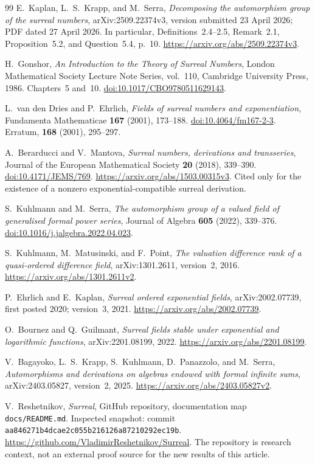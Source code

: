 \documentclass[11pt]{article}
\theoremstyle{definition}
\theoremstyle{remark}
\numberwithin{equation}{section}
\begin{document}
\begin{thebibliography}{99}
E.~Kaplan, L.~S.~Krapp, and M.~Serra,
\emph{Decomposing the automorphism group of the surreal numbers},
arXiv:2509.22374v3, version submitted 23 April 2026; PDF dated 27 April 2026.
In particular, Definitions~2.4--2.5, Remark~2.1, Proposition~5.2, and
Question~5.4, p.~10.
\url{https://arxiv.org/abs/2509.22374v3}.

H.~Gonshor,
\emph{An Introduction to the Theory of Surreal Numbers},
London Mathematical Society Lecture Note Series, vol.~110,
Cambridge University Press, 1986. Chapters~5 and~10.
\href{https://doi.org/10.1017/CBO9780511629143}{doi:10.1017/CBO9780511629143}.

L.~van den Dries and P.~Ehrlich,
\emph{Fields of surreal numbers and exponentiation},
Fundamenta Mathematicae \textbf{167} (2001), 173--188.
\href{https://doi.org/10.4064/fm167-2-3}{doi:10.4064/fm167-2-3}.
Erratum, \textbf{168} (2001), 295--297.

A.~Berarducci and V.~Mantova,
\emph{Surreal numbers, derivations and transseries},
Journal of the European Mathematical Society \textbf{20} (2018), 339--390.
\href{https://doi.org/10.4171/JEMS/769}{doi:10.4171/JEMS/769}.
\url{https://arxiv.org/abs/1503.00315v3}.
Cited only for the existence of a nonzero exponential-compatible surreal
derivation.

S.~Kuhlmann and M.~Serra,
\emph{The automorphism group of a valued field of generalised formal power series},
Journal of Algebra \textbf{605} (2022), 339--376.
\href{https://doi.org/10.1016/j.jalgebra.2022.04.023}{doi:10.1016/j.jalgebra.2022.04.023}.

S.~Kuhlmann, M.~Matusinski, and F.~Point,
\emph{The valuation difference rank of a quasi-ordered difference field},
arXiv:1301.2611, version~2, 2016.
\url{https://arxiv.org/abs/1301.2611v2}.

P.~Ehrlich and E.~Kaplan,
\emph{Surreal ordered exponential fields},
arXiv:2002.07739, first posted 2020; version~3, 2021.
\url{https://arxiv.org/abs/2002.07739}.

O.~Bournez and Q.~Guilmant,
\emph{Surreal fields stable under exponential and logarithmic functions},
arXiv:2201.08199, 2022.
\url{https://arxiv.org/abs/2201.08199}.

V.~Bagayoko, L.~S.~Krapp, S.~Kuhlmann, D.~Panazzolo, and M.~Serra,
\emph{Automorphisms and derivations on algebras endowed with formal infinite sums},
arXiv:2403.05827, version~2, 2025.
\url{https://arxiv.org/abs/2403.05827v2}.

\begingroup\raggedright
V.~Reshetnikov,
\emph{Surreal}, GitHub repository, documentation map \texttt{docs/README.md}.
Inspected snapshot: commit\\
\texttt{aa846271b4dcae2c055b216126a87210292ec19b}.
\url{https://github.com/VladimirReshetnikov/Surreal}.
The repository is research context, not an external proof source for the
new results of this article.
\par\endgroup
\end{thebibliography}
\end{document}
